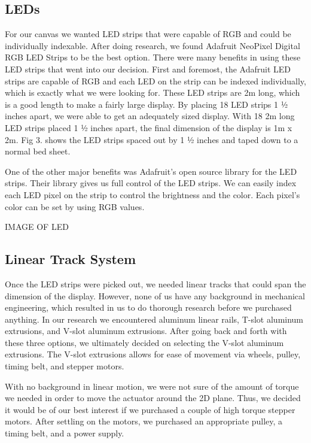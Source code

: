 \documentclass[12pt]{article}
\begin{document}
\subsection{LEDs}
For our canvas we wanted LED strips that were capable of RGB and could be individually indexable. After doing research, we found Adafruit NeoPixel Digital RGB LED Strips to be the best option. There were many benefits in using these LED strips that went into our decision. First and foremost, the Adafruit LED strips are capable of RGB and each LED on the strip can be indexed individually, which is exactly what we were looking for. These LED strips are 2m long, which is a good length to make a fairly large display. By placing 18 LED strips 1 ½ inches apart, we were able to get an adequately sized display. With 18 2m long LED strips placed 1 ½ inches apart, the final dimension of the display is 1m x 2m. Fig 3. shows the LED strips spaced out by 1 ½ inches and taped down to a normal bed sheet. 

One of the other major benefits was Adafruit’s open source library for the LED strips. Their library gives us full control of the LED strips. We can easily index each LED pixel on the strip to control the brightness and the color. Each pixel’s color can be set by using RGB values.

IMAGE OF LED

\subsection{Linear Track System}
Once the LED strips were picked out, we needed linear tracks that could span the dimension of the display. However, none of us have any background in mechanical engineering, which resulted in us to do thorough research before we purchased anything. In our research we encountered aluminum linear rails, T-slot aluminum extrusions, and V-slot aluminum extrusions. After going back and forth with these three options, we ultimately decided on selecting the V-slot aluminum extrusions. The V-slot extrusions allows for ease of movement via wheels, pulley, timing belt, and stepper motors. 

With no background in linear motion, we were not sure of the amount of torque we needed in order to move the actuator around the 2D plane. Thus, we decided it would be of our best interest if we purchased a couple of high torque stepper motors. After settling on the motors, we purchased an appropriate pulley, a timing belt, and a power supply.
\end{document}

